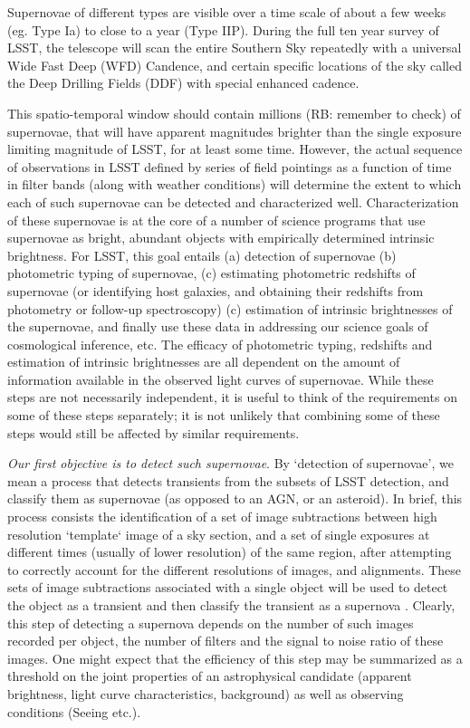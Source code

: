 Supernovae of different types are visible over a time scale of about a few 
weeks (eg. Type Ia) to close to a year (Type IIP). During the full ten year
 survey of LSST, the telescope will scan the entire Southern Sky repeatedly
 with a universal Wide Fast Deep (WFD) Candence, and certain specific locations
of the sky called the Deep Drilling Fields (DDF) with special enhanced cadence. 

This spatio-temporal window should contain millions (RB: remember to check) of supernovae, that will have apparent magnitudes brighter than the single exposure limiting magnitude of LSST, for at least some time.  However, the actual
 sequence of observations in LSST defined by series of field pointings as a
 function of time in filter bands (along with weather conditions) will
 determine the extent to which each of such supernovae can be detected and
 characterized well.  Characterization of these supernovae is at the core of a
 number of science programs that use supernovae as bright, abundant objects with empirically determined intrinsic brightness. For LSST, this goal entails (a) detection of supernovae (b) photometric typing of supernovae, (c) estimating photometric redshifts of supernovae (or identifying host galaxies,
 and obtaining their redshifts from photometry or follow-up spectroscopy)
(c) estimation of intrinsic brightnesses of the supernovae, and finally use these data in addressing our science goals of cosmological inference, etc.
The efficacy of photometric typing, redshifts and estimation of intrinsic brightnesses are all
dependent on the amount of information available in the observed light curves of supernovae. While these steps are not necessarily independent, it is useful to think of the requirements on some of these steps separately; it is not unlikely  that combining some of these steps would still be affected by similar requirements. 

{\emph{Our first objective is to detect such supernovae}}. By `detection of supernovae', we mean a process
that detects transients from the subsets of LSST detection, and classify them as supernovae (as opposed to an AGN, or an asteroid). In brief, this process 
consists the identification of a set of image subtractions between high 
resolution `template` image of a sky section, and a set of single exposures at
different times (usually of lower resolution) of the same region, after 
attempting to correctly account for the different resolutions of images, and alignments. These sets of image subtractions associated
 with a single object will be used to detect the object as a transient and then
classify the transient as a supernova . Clearly, this step of detecting a supernova depends on the number of such images recorded per object, the number of filters and the signal to noise ratio of these images. One might expect that the efficiency of this step may be summarized as a threshold on the joint properties 
of an astrophysical candidate (apparent brightness, light curve characteristics, background) as well as observing conditions (Seeing etc.).  

